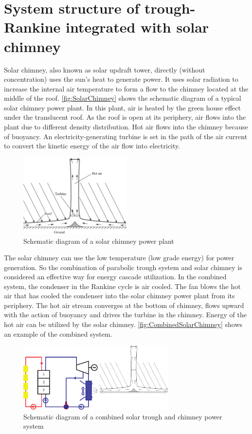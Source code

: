 \section{System structure of trough-Rankine integrated with solar chimney}

Solar chimney, also known as solar updraft tower, directly (without concentration) uses the sun's heat to generate power. It uses solar radiation to increase the internal air temperature to form a flow to the chimney located at the middle of the roof. \autoref{fig:SolarChimney} shows the schematic diagram of a typical solar chimney power plant. In this plant, air is heated by the green house effect under the translucent roof. As the roof is open at its periphery, air flows into the plant due to different density distribution. Hot air flows into the chimney because of buoyancy. An electricity-generating turbine is set in the path of the air current to convert the kinetic energy of the air flow into electricity.

\begin{figure}[!ht]
\centering 
\includegraphics[width=0.5\textwidth]{fig/SolarChimney}
\caption{Schematic diagram of a solar chimney power plant}\label{fig:SolarChimney}
\end{figure}

The solar chimney can use the low temperature (low grade energy) for power generation. So the combination of parabolic trough system and solar chimney is considered an effective way for energy cascade utilization. In the combined system, the condenser in the Rankine cycle is air cooled. The fan blows the hot air that has cooled the condenser into the solar chimney power plant from its periphery. The hot air stream converges at the bottom of chimney, flows upward with the action of buoyancy and drives the turbine in the chimney.
Energy of the hot air can be utilized by the solar chimney. \autoref{fig:CombinedSolarChimney} shows an example of the combined system. 

\begin{figure}[!ht]
\centering 
\includegraphics[width=0.7\textwidth]{fig/CombinedSolarChimney}
\caption{Schematic diagram of a combined solar trough and chimney power system}\label{fig:CombinedSolarChimney}
\end{figure}

